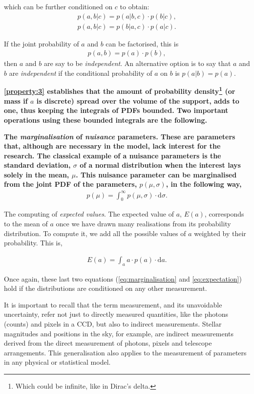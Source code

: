 which can be further conditioned on $c$ to obtain:
\begin{align}
\label{eq:conditioned}
p(a,b|c)=p(a|b,c)\cdot p(b|c),\nonumber \\
p(a,b|c)=p(b|a,c) \cdot p(a|c).
\end{align}

If the joint probability of $a$ and $b$ can be factorised, this is
\begin{align}
p(a,b)=p(a)\cdot p(b),
\end{align}
then $a$ and $b$ are say to be \emph{independent}. An alternative option is to say that $a$ and $b$ are \emph{independent} if the conditional probability of $a$ on $b$ is $p(a|b)=p(a)$.

\textbf{
\ref{property:3} establishes that the amount of probability density\footnote{Which could be infinite, like in Dirac's delta.} (or mass if $a$ is discrete) spread over the volume of the support, adds to one, thus keeping the integrals of PDFs bounded. Two important operations using these bounded integrals are the following.
}

\textbf{
The \emph{marginalisation} of \emph{nuisance} parameters. These are parameters that, although are necessary in the model, lack interest for the research. The classical example of a nuisance parameters is the standard deviation, $\sigma$ of a normal distribution when the interest lays solely in the mean, $\mu$. This nuisance parameter can be marginalised from the joint PDF of the parameters, $p(\mu,\sigma)$, in the following way,
}
\begin{align}
\label{eq:marginalisation}
p(\mu)=\int_0^{\infty} p(\mu,\sigma)\cdot \mathrm{d}\sigma.
\end{align}

The computing of \emph{expected values}. The expected value of $a$, $E(a)$, corresponds to the mean of $a$ once we have drawn many realisations from its probability distribution. To compute it, we add all the possible values of $a$ weighted by their probability. This is,

\begin{align}
\label{eq:expectation}
E(a)=\int_a a\cdot p(a)\cdot \mathrm{d}a.
\end{align}

Once again, these last two equations (\ref{eq:marginalisation} and \ref{eq:expectation}) hold if the distributions are conditioned on any other measurement.

It is important to recall that the term measurement, and its unavoidable uncertainty, refer not just to directly measured quantities, like the photons (counts) and pixels in a CCD, but also to indirect measurements. Stellar magnitudes and positions in the sky, for example, are indirect measurements derived from the direct measurement of photons, pixels and telescope arrangements. This generalisation also applies to the measurement of parameters in any physical or statistical model.%

